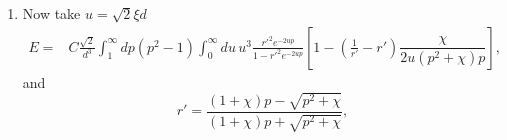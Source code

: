 \begin{enumerate}
\item Now take $u = \sqrt{2}\xi d$ 
 \begin{align}
E%
=&  C\frac{\sqrt{2}}{d^3}\int_1^\infty dp (p^2-1)\int_0^\infty du\,u^{3} 
 \frac{r'^2e^{-2u p}}{1-r'^2e^{-2u p}}\left[1- \left(\frac{1}{r'}-r'\right)\dfrac{\chi }{2u(p^2+\chi)p}\right],
\end{align}
and 
\begin{equation}
r' =  \frac{(1+\chi)p-\sqrt{p^2 + \chi}}{(1+ \chi)p+\sqrt{p^2+\chi}},
\end{equation}
\end{enumerate}

